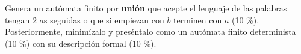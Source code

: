 \documentclass[8pt, onside]{article}
\begin{document}
Genera un autómata finito por \textbf{unión} que acepte el lenguaje de las palabras tengan 2 $a$s seguidas o que si empiezan con $b$ terminen con $a$ (10 \%).
Posteriormente, minimízalo y preséntalo como un autómata finito determinista (10 \%) con su descripción formal (10 \%).








\end{document}
